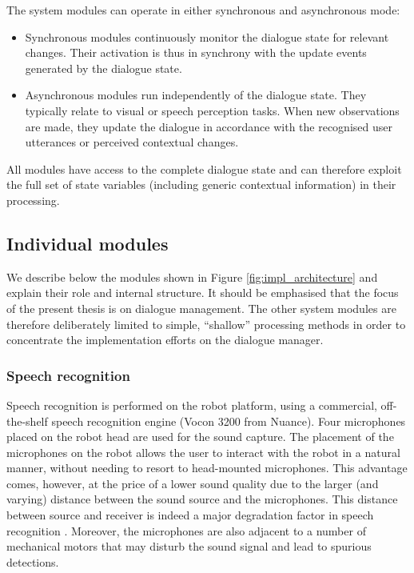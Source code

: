 The system modules can operate in either synchronous and asynchronous mode: \begin{itemize}
\item Synchronous modules continuously monitor the dialogue state for relevant changes.  Their activation is thus in synchrony with the update events generated by the dialogue state.
\item Asynchronous modules run independently of the dialogue state.  They typically relate to visual or speech perception tasks. When new observations are made, they update the dialogue in accordance with the recognised user utterances or perceived contextual changes.

\end{itemize}

All modules have access to the complete dialogue state and can therefore exploit the full set of state variables (including generic contextual information) in their processing. 

\subsection{Individual modules}

We describe below the modules shown in Figure \ref{fig:impl_architecture} and explain their role and internal structure. It should be emphasised that the focus of the present thesis is on dialogue management.  The other system modules are therefore deliberately limited to simple, ``shallow'' processing methods in order to concentrate the implementation efforts on the dialogue manager. %

\subsubsection*{Speech recognition}

Speech recognition is performed on the robot platform, using a commercial, off-the-shelf speech recognition engine (Vocon 3200 from Nuance).  Four microphones placed on the robot head are used for the sound capture.  The placement of the microphones on the robot allows the user to interact with the robot in a natural manner, without needing to resort to head-mounted microphones. This advantage comes, however, at the price of a lower sound quality due to the larger (and varying) distance between the sound source and the microphones.   This distance between source and receiver is indeed a major degradation factor in speech recognition \citep{wolfel2009distant}. Moreover, the microphones are also adjacent to a number of mechanical motors that may disturb the sound signal and lead to spurious detections.

